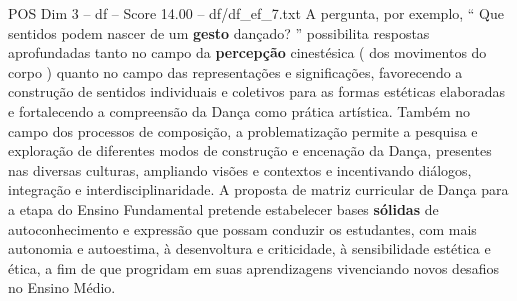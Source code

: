 \begin{textsample}{POS Dim 3 – df – Score 14.00 – df/df\_ef\_7.txt}
A pergunta, por exemplo, “ Que sentidos podem nascer de um \textbf{gesto} dançado? ” possibilita respostas aprofundadas tanto no campo da \textbf{percepção} cinestésica ( dos movimentos do corpo ) quanto no campo das representações e significações, favorecendo a construção de sentidos individuais e coletivos para as formas estéticas elaboradas e fortalecendo a compreensão da Dança como prática artística.
Também no campo dos processos de composição, a problematização permite a pesquisa e exploração de diferentes modos de construção e encenação da Dança, presentes nas diversas culturas, ampliando visões e contextos e incentivando diálogos, integração e interdisciplinaridade.
A proposta de matriz curricular de Dança para a etapa do Ensino Fundamental pretende estabelecer bases \textbf{sólidas} de autoconhecimento e expressão que possam conduzir os estudantes, com mais autonomia e autoestima, à desenvoltura e criticidade, à sensibilidade estética e ética, a fim de que progridam em suas aprendizagens vivenciando novos desafios no Ensino Médio.

\end{textsample}
